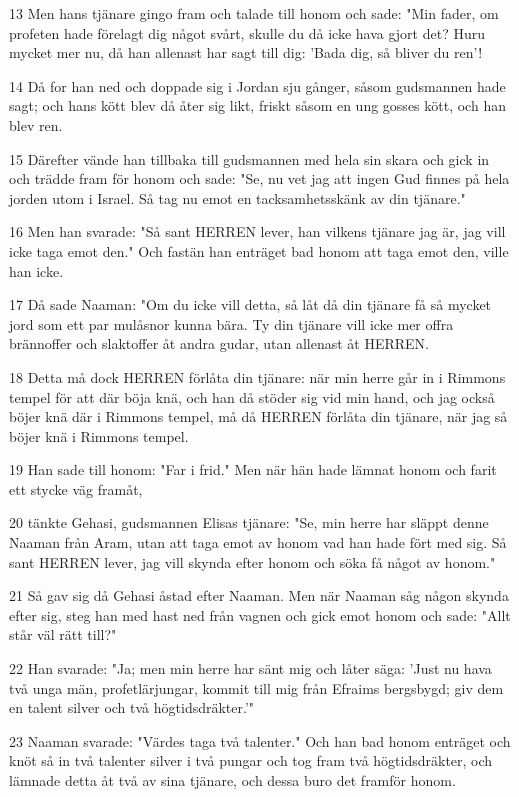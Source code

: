 \par 13 Men hans tjänare gingo fram och talade till honom och sade: "Min fader, om profeten hade förelagt dig något svårt, skulle du då icke hava gjort det? Huru mycket mer nu, då han allenast har sagt till dig: 'Bada dig, så bliver du ren'!
\par 14 Då for han ned och doppade sig i Jordan sju gånger, såsom gudsmannen hade sagt; och hans kött blev då åter sig likt, friskt såsom en ung gosses kött, och han blev ren.
\par 15 Därefter vände han tillbaka till gudsmannen med hela sin skara och gick in och trädde fram för honom och sade: "Se, nu vet jag att ingen Gud finnes på hela jorden utom i Israel. Så tag nu emot en tacksamhetsskänk av din tjänare."
\par 16 Men han svarade: "Så sant HERREN lever, han vilkens tjänare jag är, jag vill icke taga emot den." Och fastän han enträget bad honom att taga emot den, ville han icke.
\par 17 Då sade Naaman: "Om du icke vill detta, så låt då din tjänare få så mycket jord som ett par mulåsnor kunna bära. Ty din tjänare vill icke mer offra brännoffer och slaktoffer åt andra gudar, utan allenast åt HERREN.
\par 18 Detta må dock HERREN förlåta din tjänare: när min herre går in i Rimmons tempel för att där böja knä, och han då stöder sig vid min hand, och jag också böjer knä där i Rimmons tempel, må då HERREN förlåta din tjänare, när jag så böjer knä i Rimmons tempel.
\par 19 Han sade till honom: "Far i frid." Men när hän hade lämnat honom och farit ett stycke väg framåt,
\par 20 tänkte Gehasi, gudsmannen Elisas tjänare: "Se, min herre har släppt denne Naaman från Aram, utan att taga emot av honom vad han hade fört med sig. Så sant HERREN lever, jag vill skynda efter honom och söka få något av honom."
\par 21 Så gav sig då Gehasi åstad efter Naaman. Men när Naaman såg någon skynda efter sig, steg han med hast ned från vagnen och gick emot honom och sade: "Allt står väl rätt till?"
\par 22 Han svarade: "Ja; men min herre har sänt mig och låter säga: 'Just nu hava två unga män, profetlärjungar, kommit till mig från Efraims bergsbygd; giv dem en talent silver och två högtidsdräkter.'"
\par 23 Naaman svarade: "Värdes taga två talenter." Och han bad honom enträget och knöt så in två talenter silver i två pungar och tog fram två högtidsdräkter, och lämnade detta åt två av sina tjänare, och dessa buro det framför honom.
